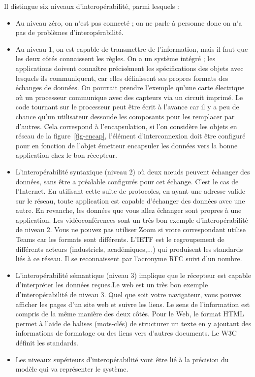 Il distingue six niveaux d’interopérabilité, parmi lesquels :

\begin{itemize}
     \item Au niveau zéro, on n'est pas connecté ; on ne parle à personne donc on n'a pas de problèmes d'interopérabilité. 
    \item  Au niveau 1, on est capable de transmettre de l'information,  mais il faut que les deux côtés connaissent les règles. On a un système intégré ; les applications doivent  connaître précisément les spécifications des objets avec lesquels ils communiquent,  car elles définissent ses propres formats des échanges de données. On pourrait prendre l'exemple qu'une carte électrique où un processeur communique avec des capteurs via un circuit imprimé. Le code tournant sur le processeur peut être écrit à l'avance car il y a peu de chance qu'un utilisateur dessoude les composants pour les remplacer par d'autres. Cela correspond à l'encapsulation, si l'on considère les objets en réseau de la figure~\vref{fig-encap}, l'élément d'interconnexion doit être configuré pour en fonction de l'objet émetteur encapsuler les données vers la bonne application chez le bon récepteur. 
    \item L’interopérabilité syntaxique (niveau 2) où deux nœuds peuvent échanger des données, sans être a préalable configurés pour cet échange. C'est le cas de l'Internet. En utilisant cette suite de protocoles, en ayant une adresse valide sur le réseau, toute application est capable d'échanger des données avec une autre. En revanche, les données que vous allez échanger sont propres à une application. Les vidéoconférences sont un très bon exemple d'interopérabilité de niveau 2. Vous ne pouvez pas utiliser Zoom si votre correspondant utilise Teams car les formats sont différents. L'\ac{IETF}  est le regroupement de différents acteurs (industriels, académiques,...) qui produisent les standards liés à ce réseau. Il se reconnaissent par l'acronyme \ac{RFC} suivi d'un nombre. 
    \item L’interopérabilité sémantique (niveau 3) implique que le récepteur est capable d'interpréter les données reçues.Le web est un très bon exemple d'interopérabilité de niveau 3. Quel que soit votre navigateur, vous pouvez afficher les pages d'un site web et suivre les liens. Le sens de l'information est compris de la même manière des deux côtés. Pour le Web, le format \ac{HTML} permet à l'aide de balises (mots-clés) de structurer un texte en y ajoutant des informations de formatage ou des liens vers d'autres documents. Le W3C définit les standards.
     \item Les niveaux supérieurs d'interopérabilité vont être lié à la précision du modèle qui va représenter le système.     
\end{itemize}


